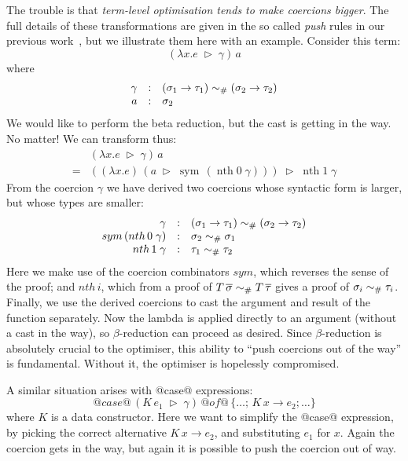 \documentclass[a4paper,UKenglish]{lipics}
\newcommand{\psim}{\mathrel{\sim_{\tiny \#}}}
\newcommand{\sym}[1]{\mathop{sym}\, #1}
\newcommand{\nth}[2]{\mathop{nth} #1\;#2}
\newcommand{\tcast}[2]{#1\;\triangleright\;#2}
\begin{document}
The trouble is that \emph{term-level optimisation tends to make
coercions bigger}. The full details of these transformations are given in the so called {\em push}
rules in our previous work~\cite{weirich+:fc2}, but we illustrate them here with an example.
Consider this term:
$$
  (\tcast{\lambda x.e}{\gamma})\, a
$$
where
$$
\begin{array}{rcl}
  \gamma & : & (\sigma_1 \rightarrow \tau_1) \psim (\sigma_2 \rightarrow \tau_2) \\
  a      & : & \sigma_2
\end{array}
$$
We would like to perform the beta reduction, but the cast is getting in
the way.  No matter!  We can transform thus:
$$\begin{array}{ll}
  &  (\tcast{\lambda x.e}{\gamma})\, a \\
= &  \tcast{((\lambda x.e)\, (\tcast{a}{\sym{(\nth{0}{\gamma})}}))}{\nth{1}{\gamma}}
\end{array}
$$
From the coercion $\gamma$ we have derived two coercions whose syntactic form
is larger, but whose types are smaller:
$$
\begin{array}{rcl}
  \gamma & : & (\sigma_1 \rightarrow \tau_1) \psim (\sigma_2 \rightarrow \tau_2) \\
\sym{(\nth{0}{\gamma})} & : & \sigma_2 \psim \sigma_1  \\
\nth{1}{\gamma} & : & \tau_1 \psim \tau_2 
\end{array}
$$
Here we make use of the coercion combinators $sym$, which reverses the sense of
the proof; and $nth\,i$, which from a proof of $T\,\overline{\sigma} \psim T \, \overline{\tau}$
gives a proof of $\sigma_i \psim \tau_i$.  Finally, we use the derived coercions to 
cast the argument and result of the function separately.  Now the lambda is
applied directly to an argument (without a cast in the way), so 
$\beta$-reduction can proceed as desired.
Since $\beta$-reduction is absolutely
crucial to the optimiser, this ability to ``push coercions out of the way'' is
fundamental. Without it, the optimiser is hopelessly compromised.

A similar situation arises with @case@ expressions:
$$@case@\,(\tcast{K\,e_1}{\gamma})\,@of@\,\{\ldots;\,K\,x \rightarrow e_2; \ldots \}$$
where $K$ is a data constructor.  
Here we want to simplify the @case@ expression, by picking the correct alternative
$K\,x \rightarrow e_2$, and substituting $e_1$ for $x$.  Again the coercion gets in the way, but
again it is possible to push the coercion out of way.  
\end{document}
